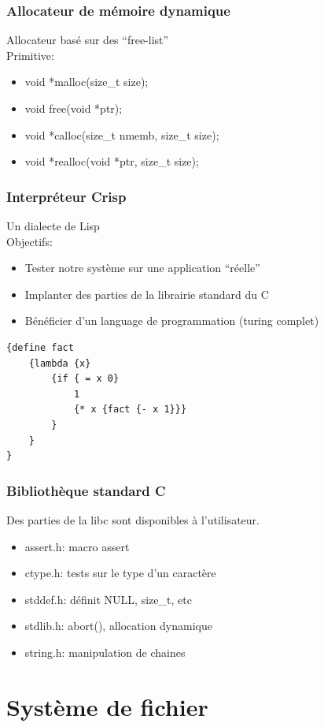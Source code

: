 \documentclass{beamer}
\begin{document}
\begin{frame}
  \frametitle{Allocateur de mémoire dynamique}
  Allocateur basé sur des ``free-list''\\

  Primitive:
  \begin{itemize}
    \item void *malloc(size\_t size);
    \item void free(void *ptr);
    \item void *calloc(size\_t nmemb, size\_t size);
    \item void *realloc(void *ptr, size\_t size);
  \end{itemize}
\end{frame}

\begin{frame}[fragile]
  \frametitle{Interpréteur Crisp}
  Un dialecte de Lisp\\
  Objectifs:
  \begin{itemize}
  \item Tester notre système sur une application ``réelle''
  \item Implanter des parties de la librairie standard du C
  \item Bénéficier d'un language de programmation (turing complet)
  \end{itemize}

  {\scriptsize
\begin{verbatim}
{define fact
    {lambda {x}
        {if { = x 0}
            1
            {* x {fact {- x 1}}}
        }
    }
}
\end{verbatim}
}
\end{frame}

\begin{frame}
  \frametitle{Bibliothèque standard C}
  Des parties de la libc sont disponibles à l'utilisateur.

  \begin{itemize}
    \item assert.h: macro assert
    \item ctype.h: tests sur le type d'un caractère
    \item stddef.h: définit NULL, size\_t, etc
    \item stdlib.h: abort(), allocation dynamique
    \item string.h: manipulation de chaines
  \end{itemize}
\end{frame}

\section{Système de fichier}
\end{document}
